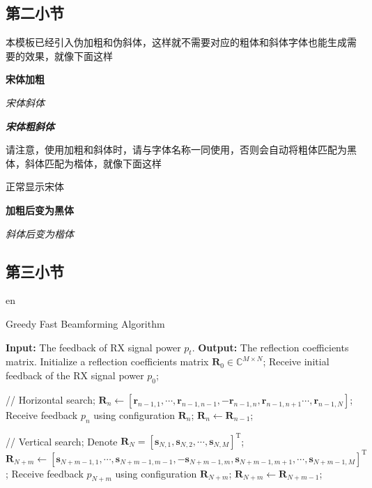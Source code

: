 \documentclass[supercite]{HustGraduPaper}
\begin{document}
	\subsection{第二小节}
	本模板已经引入伪加粗和伪斜体，这样就不需要对应的粗体和斜体字体也能生成需要的效果，就像下面这样
	
	{\songti \bfseries 宋体加粗}
	
	{\songti \itshape 宋体斜体}
	
	{\songti \bfseries \itshape 宋体粗斜体}
	
	请注意，使用加粗和斜体时，请与字体名称一同使用，否则会自动将粗体匹配为黑体，斜体匹配为楷体，就像下面这样
	
	{正常显示宋体}
	
	{\bfseries 加粗后变为黑体}
	
	{\itshape 斜体后变为楷体}
	
	\subsection{第三小节}
	
	
	en 
	\begin{algorithm}
		\caption{Greedy Fast Beamforming Algorithm}
		\label{alg:GreedyAlgorithm}
		\begin{algorithmic}[1]
			\STATE \textbf{Input: } The feedback of RX signal power $p_t$.
			\STATE \textbf{Output: } The reflection coefficients matrix.
			\STATE Initialize a reflection coefficients matrix $ \mathbf{R}_0\in \mathbb{C}^{M \times N }$;
			\STATE Receive initial feedback of the RX signal power $ p_0 $;
			
			\STATE // Horizontal search;
			\STATE  $ \mathbf{R}_{n} \leftarrow [\mathbf{r}_{n-1,1},\cdots,\mathbf{r}_{n-1,n-1},- \mathbf{r}_{n-1,n}, \mathbf{r}_{n-1,n+1}\cdots,\mathbf{r}_{n-1,N}] $;
			\STATE Receive feedback $ p_{n} $ using configuration $ \mathbf{R}_{n}$;
			\STATE $ \mathbf{R}_{n} \leftarrow \mathbf{R}_{n-1}$;
			\ENDIF
			\ENDFOR
			
			\STATE // Vertical search;
			\STATE Denote $ \mathbf{R}_{N} =[\mathbf{s}_{N,1},\mathbf{s}_{N,2},\cdots,\mathbf{s}_{N,M}]^\mathrm{T}$;
			\small
			\STATE  $\mathbf{R}_{N+m} \leftarrow [\mathbf{s}_{N+m-1,1},\cdots,\mathbf{s}_{N+m-1,m-1},- \mathbf{s}_{N+m-1,m}, \mathbf{s}_{N+m-1,m+1}, \cdots, \mathbf{s}_{N+m-1,M}]^\mathrm{T}$;
			\normalsize
			\STATE Receive feedback $ p_{N+m} $ using configuration $\mathbf{R}_{N+m}$;
			\STATE $ \mathbf{R}_{N+m} \leftarrow \mathbf{R}_{N+m-1}$;
			\ENDIF
			\ENDFOR
		\end{algorithmic}
	\end{algorithm}
	
\end{document}
